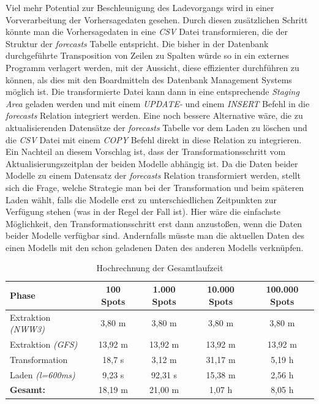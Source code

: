 Viel mehr Potential zur Beschleunigung des Ladevorgangs wird in einer
Vorverarbeitung der Vorhersagedaten gesehen. Durch diesen zusätzlichen
Schritt könnte man die Vorhersagedaten in eine \textit{CSV} Datei
transformieren, die der Struktur der \textit{forecasts} Tabelle
entspricht. Die bisher in der Datenbank durchgeführte Transposition
von Zeilen zu Spalten würde so in ein externes Programm verlagert
werden, mit der Aussicht, diese effizienter durchführen zu können, als
dies mit den Boardmitteln des Datenbank Management Systems möglich
ist. Die transformierte Datei kann dann in eine entsprechende
\textit{Staging Area} geladen werden und mit einem \textit{UPDATE-}
und einem \textit{INSERT} Befehl in die \textit{forecasts} Relation
integriert werden. Eine noch bessere Alternative wäre, die zu
aktualisierenden Datensätze der \textit{forecasts} Tabelle vor dem
Laden zu löschen und die \textit{CSV} Datei mit einem \textit{COPY}
Befehl direkt in diese Relation zu integrieren. Ein Nachteil an diesem
Vorschlag ist, dass der Transformationsschritt vom
Aktualisierungszeitplan der beiden Modelle abhängig ist. Da die Daten
beider Modelle zu einem Datensatz der \textit{forecasts} Relation
transformiert werden, stellt sich die Frage, welche Strategie man bei
der Transformation und beim späteren Laden wählt, falls die Modelle
erst zu unterschiedlichen Zeitpunkten zur Verfügung stehen (was in der
Regel der Fall ist). Hier wäre die einfachste Möglichkeit, den
Transformationsschritt erst dann anzustoßen, wenn die Daten beider
Modelle verfügbar sind. Andernfalls müsste man die aktuellen Daten des
einen Modells mit den schon geladenen Daten des anderen Modells
verknüpfen.

\begin{table}[h]
  \centering
  {\sf
    \footnotesize
    \begin{longtable}{l|c|c|c|c}

      \toprule
      \textbf{Phase} & \textbf{100 Spots} & \textbf{1.000 Spots} & \textbf{10.000 Spots} & \textbf{100.000 Spots}\\
      \midrule
      Extraktion \textit{(NWW3)} & 3,80 m & 3,80 m & 3,80 m & 3,80 m \\
      Extraktion \textit{(GFS)} & 13,92 m & 13,92 m & 13,92 m & 13,92 m \\
      \midrule
      Transformation & 18,7 s & 3,12 m & 31,17 m & 5,19 h \\
      Laden \textit{(l=600ms)} & 9,23 s & 92,31 s & 15,38 m & 2,56 h \\
      \bottomrule
      \textbf{Gesamt:} & 18,19 m & 21,00 m & 1,07 h & 8,05 h \\
      \bottomrule
    \end{longtable}
  }

  \caption{Hochrechnung der Gesamtlaufzeit}
  \label{tab:gesamt_laufzeit}

\end{table}

